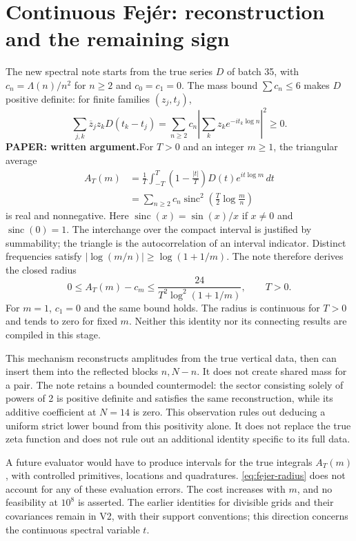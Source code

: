 \documentclass[11pt,a4paper]{article}
\theoremstyle{remark}
\newcommand{\Lam}{\Lambda}
\newcommand{\paper}{\textbf{PAPER: written argument.}\space}
\begin{document}
\section{Continuous Fej\'er: reconstruction and the remaining sign}\label{sec:fejer}
The new spectral note starts from the true series $D$ of batch 35, with
$c_n=\Lam(n)/n^2$ for $n\ge2$ and $c_0=c_1=0$.
The mass bound $\sum c_n\le6$ makes $D$ positive definite: for finite
families $(z_j,t_j)$,
\[
\sum_{j,k}\overline z_jz_kD(t_k-t_j)
=\sum_{n\ge2}c_n\left|\sum_k z_ke^{-it_k\log n}\right|^2\ge0.
\]
\paper For $T>0$ and an integer $m\ge1$, the triangular average
\begin{equation}\label{eq:fejer-cont}
\begin{split}
A_T(m)&=\frac1T\int_{-T}^{T}\left(1-\frac{|t|}{T}\right)
D(t)e^{it\log m}\,dt\\
&=\sum_{n\ge2}c_n\operatorname{sinc}^2\!\left(\frac T2\log\frac mn\right)
\end{split}
\end{equation}
is real and nonnegative. Here $\operatorname{sinc}(x)=\sin(x)/x$ if
$x\ne0$ and $\operatorname{sinc}(0)=1$. The interchange over the compact interval is
justified by summability; the triangle is the autocorrelation of an
interval indicator. Distinct frequencies satisfy
$|\log(m/n)|\ge\log(1+1/m)$. The note therefore derives the closed radius
\begin{equation}\label{eq:fejer-radius}
0\le A_T(m)-c_m\le
\frac{24}{T^2\log^2(1+1/m)},\qquad T>0.
\end{equation}
For $m=1$, $c_1=0$ and the same bound holds. The radius is continuous
for $T>0$ and tends to zero for fixed $m$. Neither this identity nor its
connecting results are compiled in this stage.

This mechanism reconstructs amplitudes from the true vertical data,
then can insert them into the reflected blocks $n,N-n$. It does not create
shared mass for a pair. The note retains a bounded countermodel:
the sector consisting solely of powers of 2 is positive definite and satisfies the
same reconstruction, while its additive coefficient at $N=14$ is zero.
This observation rules out deducing a uniform strict lower bound from
this positivity alone. It does not replace the true zeta function and does not rule out an
additional identity specific to its full data.

A future evaluator would have to produce intervals for the true
integrals $A_T(m)$, with controlled primitives, locations and quadratures.
\eqref{eq:fejer-radius} does not account for any of these evaluation
errors. The cost increases with $m$, and no feasibility at $10^8$
is asserted. The earlier identities for divisible grids and their
covariances remain in V2, with their support conventions; this
direction concerns the continuous spectral variable $t$.
\end{document}
